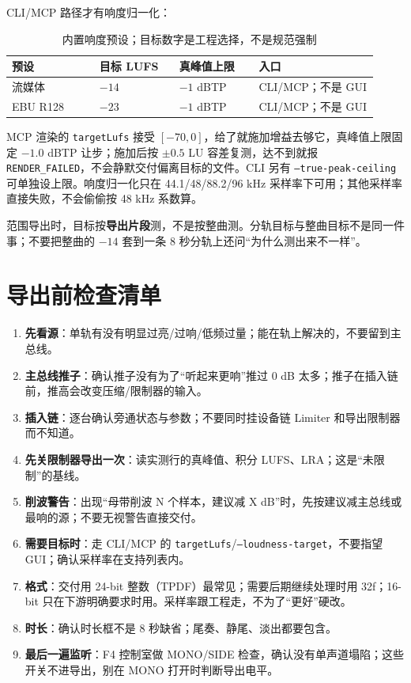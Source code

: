 CLI/MCP 路径才有响度归一化：

\begin{table}[htbp]
\centering
\small
\begin{tabular}{@{}p{0.22\linewidth}p{0.20\linewidth}p{0.20\linewidth}p{0.30\linewidth}@{}}
\hline
预设 & 目标 LUFS & 真峰值上限 & 入口 \\
\hline
流媒体 & $-14$ & $-1$ dBTP & CLI/MCP；不是 GUI \\
EBU R128 & $-23$ & $-1$ dBTP & CLI/MCP；不是 GUI \\
\hline
\end{tabular}
\caption{内置响度预设；目标数字是工程选择，不是规范强制}
\label{tab:loudness-presets}
\end{table}

MCP 渲染的 \texttt{targetLufs} 接受 $[-70,0]$，给了就施加增益去够它，真峰值上限固定 $-1.0$ dBTP 让步；施加后按 $\pm0.5$ LU 容差复测，达不到就报 \texttt{RENDER\_FAILED}，不会静默交付偏离目标的文件。CLI 另有 \texttt{--true-peak-ceiling} 可单独设上限。响度归一化只在 44.1/48/88.2/96 kHz 采样率下可用；其他采样率直接失败，不会偷偷按 48 kHz 系数算。

范围导出时，目标按\textbf{导出片段}测，不是按整曲测。分轨目标与整曲目标不是同一件事；不要把整曲的 $-14$ 套到一条 8 秒分轨上还问“为什么测出来不一样”。

\section{导出前检查清单}

\begin{enumerate}
  \item \textbf{先看源}：单轨有没有明显过亮/过响/低频过量；能在轨上解决的，不要留到主总线。
  \item \textbf{主总线推子}：确认推子没有为了“听起来更响”推过 0 dB 太多；推子在插入链前，推高会改变压缩/限制器的输入。
  \item \textbf{插入链}：逐台确认旁通状态与参数；不要同时挂设备链 Limiter 和导出限制器而不知道。
  \item \textbf{先关限制器导出一次}：读实测行的真峰值、积分 LUFS、LRA；这是“未限制”的基线。
  \item \textbf{削波警告}：出现“母带削波 N 个样本，建议减 X dB”时，先按建议减主总线或最响的源；不要无视警告直接交付。
  \item \textbf{需要目标时}：走 CLI/MCP 的 \texttt{targetLufs}/\texttt{--loudness-target}，不要指望 GUI；确认采样率在支持列表内。
  \item \textbf{格式}：交付用 24-bit 整数（TPDF）最常见；需要后期继续处理时用 32f；16-bit 只在下游明确要求时用。采样率跟工程走，不为了“更好”硬改。
  \item \textbf{时长}：确认时长框不是 8 秒缺省；尾奏、静尾、淡出都要包含。
  \item \textbf{最后一遍监听}：F4 控制室做 MONO/SIDE 检查，确认没有单声道塌陷；这些开关不进导出，别在 MONO 打开时判断导出电平。
\end{enumerate}


